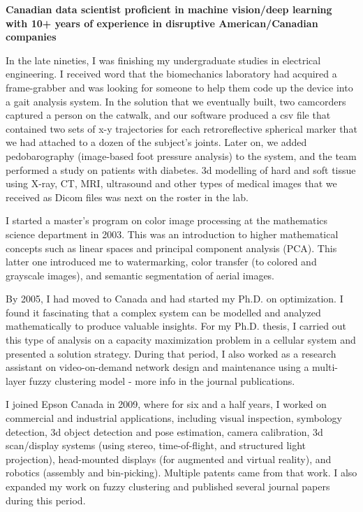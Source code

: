 \onehalfspace
\textbf{\large Canadian data scientist proficient in machine vision/deep learning with 10+ years of experience in disruptive American/Canadian companies}
\singlespace

\vspace{0.8cm}

In the late nineties, I was finishing my undergraduate studies in electrical engineering. I received word that the biomechanics laboratory had acquired a frame-grabber and was looking for someone to help them code up the device into a gait analysis system. In the solution that we eventually built, two camcorders captured a person on the catwalk, and our software produced a csv file that contained two sets of x-y trajectories for each retroreflective spherical marker that we had attached to a dozen of the subject’s joints. Later on, we added pedobarography (image-based foot pressure analysis) to the system, and the team performed a study on patients with diabetes. 3d modelling of hard and soft tissue using X-ray, CT, MRI, ultrasound and other types of medical images that we received as Dicom files was next on the roster in the lab.

\newcommand{\osspacing}{\vspace{0.5cm}}

\osspacing
I started a master’s program on color image processing at the mathematics science department in 2003. This was an introduction to higher mathematical concepts such as linear spaces and principal component analysis (PCA). This latter one introduced me to watermarking, color transfer (to colored and grayscale images), and semantic segmentation of aerial images.

\osspacing
By 2005, I had moved to Canada and had started my Ph.D. on optimization. I found it fascinating that a complex system can be modelled and analyzed mathematically to produce valuable insights. For my Ph.D. thesis, I carried out this type of analysis on a capacity maximization problem in a cellular system and presented a solution strategy. During that period, I also worked as a research assistant on video-on-demand network design and maintenance using a multi-layer fuzzy clustering model - more info in the journal publications.

\osspacing
I joined Epson Canada in 2009, where for six and a half years, I worked on commercial and industrial applications, including visual inspection, symbology detection, 3d object detection and pose estimation, camera calibration, 3d scan/display systems (using stereo, time-of-flight, and structured light projection), head-mounted displays (for augmented and virtual reality), and robotics (assembly and bin-picking). Multiple patents came from that work. I also expanded my work on fuzzy clustering and published several journal papers during this period.			

